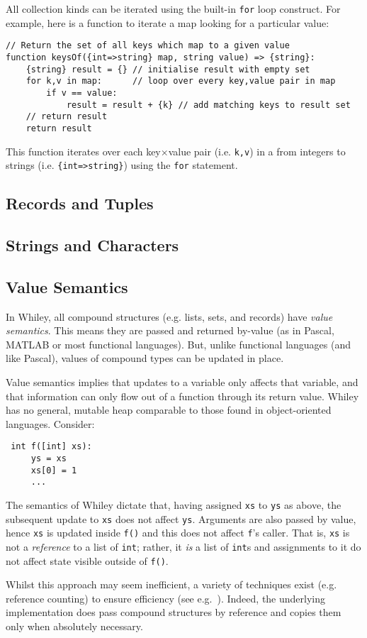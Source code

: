 All collection kinds can be iterated using the built-in
\lstinline{for} loop construct.  For example, here is a function to iterate a map looking for a particular value:

\begin{lstlisting}
// Return the set of all keys which map to a given value
function keysOf({int=>string} map, string value) => {string}:
    {string} result = {} // initialise result with empty set
    for k,v in map:      // loop over every key,value pair in map
        if v == value:
            result = result + {k} // add matching keys to result set
    // return result
    return result
\end{lstlisting}

\noindent This function iterates over each key$\times$value pair (i.e. \lstinline{k,v}) in a from integers to strings (i.e. \lstinline|{int=>string}|) using the \lstinline{for} statement.

\subsection{Records and Tuples}

\subsection{Strings and Characters}

\subsection{Value Semantics}
\label{value_semantics}
In Whiley, all compound structures (e.g. lists, sets, and records)
have {\em value semantics}.  This means they are passed and returned
by-value (as in Pascal, MATLAB or most functional languages).  But, unlike
functional languages (and like Pascal), values of compound types can
be updated in place.

Value semantics implies that updates to a variable only affects that
variable, and that information can only flow out of a function through
its return value.  Whiley has no general, mutable heap comparable to
those found in object-oriented languages.  Consider:
\begin{lstlisting}
 int f([int] xs):
     ys = xs
     xs[0] = 1
     ...
\end{lstlisting}
The semantics of Whiley dictate that, having assigned \lstinline{xs}
to \lstinline{ys} as above, the subsequent update to \lstinline{xs}
does not affect \lstinline{ys}.  Arguments are also passed by value,
hence \lstinline{xs} is updated inside \lstinline{f()} and this does
not affect \lstinline{f}'s caller.  That is, \lstinline{xs} is not a
{\em reference} to a list of \lstinline{int}; rather, it {\em is} a
list of \lstinline{int}s and assignments to it do not affect state
visible outside of \lstinline{f()}. 

Whilst this approach may seem inefficient, a variety of techniques
exist (e.g. reference counting) to ensure efficiency (see
e.g.~\cite{LH11,Shank01,Ode91}).  Indeed, the underlying
implementation does pass compound structures by reference and copies
them only when absolutely necessary.

